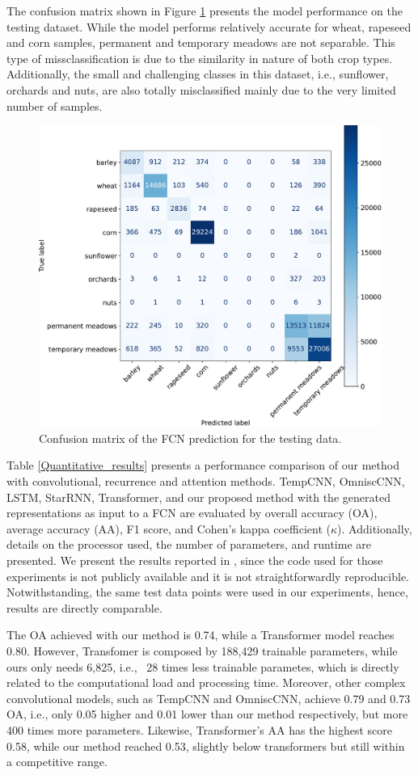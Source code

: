 \documentclass[journal,article,submit,pdftex,moreauthors]{Definitions/mdpi}
\begin{document}
The confusion matrix shown in Figure \ref{confusion_matrix} presents the model performance on the testing dataset.
While the model performs relatively accurate for wheat, rapeseed and corn samples, permanent and temporary meadows are not separable. This type of missclassification is due to the similarity in nature of both crop types.
Additionally, the small and challenging classes in this dataset, i.e., sunflower, orchards and nuts, are also totally misclassified mainly due to the very limited number of samples.
\begin{figure}[H]
	\centering
	\includegraphics[width=.57\textwidth]{figures/confusion_matrix_fcn_run_9.pdf}
	\caption{Confusion matrix of the FCN prediction for the testing data.}
	\label{confusion_matrix}
\end{figure}
Table \ref{Quantitative_results} presents a performance comparison of our method with convolutional, recurrence and attention methods. 
TempCNN, OmniscCNN, LSTM, StarRNN, Transformer, and our proposed method with the generated representations as input to a FCN are evaluated by overall accuracy (OA), average accuracy (AA), F1 score, and Cohen's kappa coefficient ($\kappa$). 
Additionally, details on the processor used, the number of parameters, and runtime are presented. 
We present the results reported in \cite{Russwurm2020}, since the code used for those experiments is not publicly available and it is not straightforwardly reproducible. 
Notwithstanding, the same test data points were used in our experiments, hence, results are directly comparable.

The OA achieved with our method is 0.74, while a Transformer model reaches 0.80. However, Transfomer is composed by 188,429 trainable parameters, while ours only needs 6,825, i.e., ~28 times less trainable parametes, which is directly related to the computational load and processing time. 
Moreover, other complex convolutional models, such as TempCNN and OmniscCNN, achieve 0.79 and 0.73 OA, i.e., only 0.05 higher and 0.01 lower than our method respectively, but more 400 times more parameters.
Likewise, Transformer's AA has the highest score 0.58, while our method reached 0.53, slightly below transformers but still within a competitive range.
\end{document}
